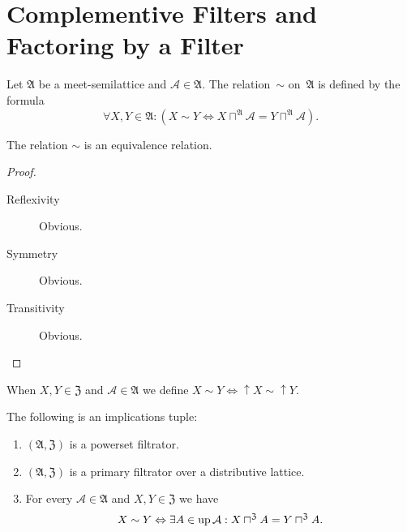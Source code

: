 \section{Complementive Filters and Factoring by a Filter}
\begin{defn}
Let $\mathfrak{A}$ be a meet-semilattice and $\mathcal{A}\in\mathfrak{A}$.
The relation~$\sim$ on~$\mathfrak{A}$ is defined by the formula
\[
\forall X,Y\in\mathfrak{A:}(X\sim Y\Leftrightarrow X\sqcap^{\mathfrak{A}}\mathcal{A}=Y\sqcap^{\mathfrak{A}}\mathcal{A}).
\]
\end{defn}

\begin{prop}
The relation $\sim$ is an equivalence relation.\end{prop}
\begin{proof}
~
\begin{description}
\item [{Reflexivity}] Obvious.
\item [{Symmetry}] Obvious.
\item [{Transitivity}] Obvious.
\end{description}
\end{proof}
\begin{defn}
When $X,Y\in\mathfrak{Z}$ and $\mathcal{A}\in\mathfrak{A}$ we define
$X\sim Y\Leftrightarrow\uparrow X\sim\uparrow Y$.\end{defn}
\begin{thm}
\label{eqrel-princ}The following is an implications tuple:
\begin{enumerate}
\item \label{eqrel-princ-p}$(\mathfrak{A},\mathfrak{Z})$ is a powerset
filtrator.
\item \label{eqrel-princ-fltr}$(\mathfrak{A},\mathfrak{Z})$ is a primary
filtrator over a distributive lattice.
\item \label{eqrel-princ-conc}For every $\mathcal{A}\in\mathfrak{A}$ and
$X,Y\in\mathfrak{Z}$ we have
\[
X\sim Y\Leftrightarrow\exists A\in\operatorname{up}\mathcal{A}:X\sqcap^{\mathfrak{Z}}A=Y\sqcap^{\mathfrak{Z}}A.
\]

\end{enumerate}
\end{thm}
